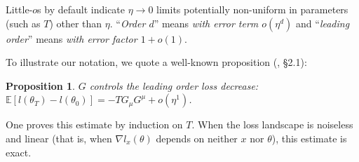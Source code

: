 \documentclass[anon,12pt]{colt2021} %
\newtheorem{prop}{Proposition}
\newcommand{\expc}{\mathbb{E}}
\begin{document}
            Little-$o$s by default indicate $\eta\to 0$ limits potentially
            non-uniform in parameters (such as $T$) other than $\eta$. 
            ``\emph{Order $d$}'' means \emph{with error term
            $o(\eta^d)$} and ``\emph{leading order}'' means \emph{with error factor
            $1+o(1)$}.


            To illustrate our notation, we quote a well-known proposition
            (\cite{ne04}, \S 2.1):
            \begin{prop}\label{prop:nest}
                $G$ controls the leading order loss decrease:
                $
                    \expc[l(\theta_T) - l(\theta_0)] =%
                    - 
                    T G_\mu G^\mu
                    + o(\eta^1)
                $.
            \end{prop}
            One proves this estimate by induction on $T$.  When the loss
            landscape is noiseless and linear (that is, when $\nabla
            l_x(\theta)$ depends on neither $x$ nor $\theta$), this estimate is
            exact.
\end{document}
